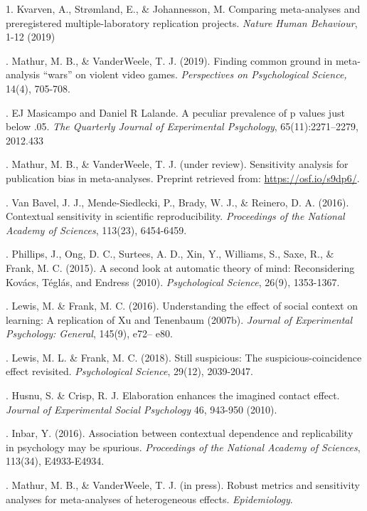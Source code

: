 \documentclass[12pt]{article}
\begin{document}
1. Kvarven, A., Strømland, E., \& Johannesson, M. Comparing meta-analyses and preregistered multiple-laboratory replication projects. {\it Nature Human Behaviour}, 1-12 (2019)
 \vspace{3mm}
 
. Mathur, M. B., \& VanderWeele, T. J. (2019). Finding common ground in meta-analysis “wars” on violent video games. {\it  Perspectives on Psychological Science,} 14(4), 705-708.
\vspace{3mm}

. EJ Masicampo and Daniel R Lalande. A peculiar prevalence of p values just below .05. {\it The Quarterly Journal of Experimental Psychology}, 65(11):2271–2279, 2012.433
\vspace{3mm}

. Mathur, M. B., \& VanderWeele, T. J. (under review). Sensitivity analysis for publication bias in meta-analyses. Preprint retrieved from:  \url{ https://osf.io/s9dp6/}.
\vspace{3mm}

. Van Bavel, J. J., Mende-Siedlecki, P., Brady, W. J., \& Reinero, D. A. (2016). Contextual sensitivity in scientific reproducibility.  {\it Proceedings of the National Academy of Sciences}, 113(23), 6454-6459.
\vspace{3mm}

. Phillips, J., Ong, D. C., Surtees, A. D., Xin, Y., Williams, S., Saxe, R., \& Frank, M. C. (2015). A second look at automatic theory of mind: Reconsidering Kovács, Téglás, and Endress (2010).  {\it Psychological Science}, 26(9), 1353-1367.
\vspace{3mm}

. Lewis, M. \& Frank, M. C. (2016). Understanding the effect of social context on learning: A replication of Xu and Tenenbaum (2007b).  {\it Journal of Experimental Psychology: General}, 145(9), e72– e80.
\vspace{3mm}

. Lewis, M. L. \& Frank, M. C. (2018). Still suspicious: The suspicious-coincidence effect revisited.  {\it Psychological Science}, 29(12), 2039-2047.
\vspace{3mm}

. Husnu, S. \& Crisp, R. J. Elaboration enhances the imagined contact effect. {\it Journal of Experimental Social Psychology} 46, 943-950 (2010).
\vspace{3mm}

. Inbar, Y. (2016). Association between contextual dependence and replicability in psychology may be spurious.  {\it Proceedings of the National Academy of Sciences}, 113(34), E4933-E4934.
\vspace{3mm}

.  Mathur, M. B., \& VanderWeele, T. J. (in press). Robust metrics and sensitivity analyses for meta-analyses of heterogeneous effects. {\it Epidemiology}.
\end{document}
